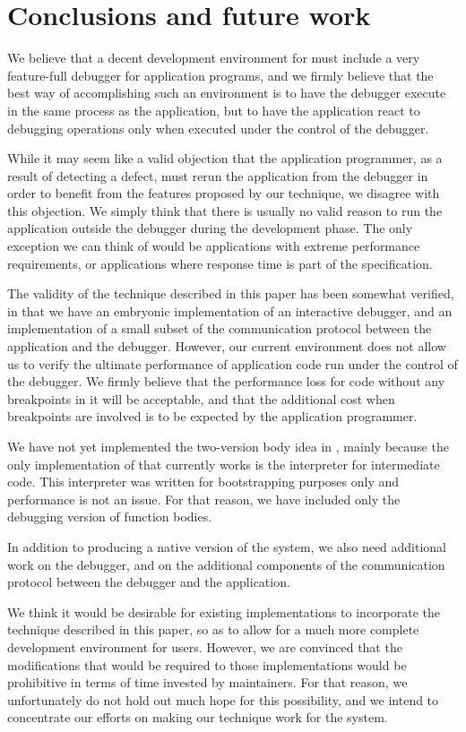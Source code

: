 \section{Conclusions and future work}

We believe that a decent development environment for \commonlisp{}
must include a very feature-full debugger for application programs, and
we firmly believe that the best way of accomplishing such an
environment is to have the debugger execute in the same process as the
application, but to have the application react to debugging operations
only when executed under the control of the debugger.

While it may seem like a valid objection that the application
programmer, as a result of detecting a defect, must rerun the
application from the debugger in order to benefit from the features
proposed by our technique, we disagree with this objection.  We simply
think that there is usually no valid reason to run the application
outside the debugger during the development phase.  The only exception
we can think of would be applications with extreme performance
requirements, or applications where response time is part of the
specification.

The validity of the technique described in this paper has been
somewhat verified, in that we have an embryonic implementation of an
interactive debugger, and an implementation of a small subset of the
communication protocol between the application and the debugger.
However, our current environment does not allow us to verify the
ultimate performance of application code run under the control of the
debugger.  We firmly believe that the performance loss for code
without any breakpoints in it will be acceptable, and that the
additional cost when breakpoints are involved is to be expected by the
application programmer.

We have not yet implemented the two-version body idea
 in \sicl{},
mainly because the only implementation of \sicl{} that currently works
is the interpreter for intermediate code.  This interpreter was
written for bootstrapping purposes only and performance is not an
issue.  For that reason, we have included only the debugging version
of function bodies.

In addition to producing a native version of the \sicl{} system, we
also need additional work on the \clordane{} debugger, and on the
additional components of the communication protocol between the
debugger and the application.

We think it would be desirable for existing \commonlisp{}
implementations to incorporate the technique described in this paper,
so as to allow for a much more complete development environment for
users.  However, we are convinced that the modifications that would be
required to those implementations would be prohibitive in terms of
time invested by maintainers.  For that reason, we unfortunately do
not hold out much hope for this possibility, and we intend to
concentrate our efforts on making our technique work for the \sicl{}
system.
